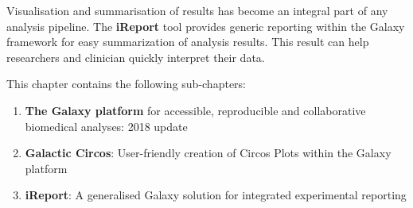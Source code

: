 Visualisation and summarisation of results has become an integral part of any analysis pipeline. The \textbf{iReport} tool provides generic reporting within the Galaxy framework for easy summarization of analysis results. This result can help researchers and clinician quickly interpret their data.


This chapter contains the following sub-chapters:

\begin{enumerate}[label=\ref{chapter:general}.\arabic*]
\itemsep-0.5em
\setcounter{enumi}{-1}
\item \textbf{The Galaxy platform} for accessible, reproducible and collaborative biomedical analyses: 2018 update
\item \textbf{Galactic Circos}: User-friendly creation of Circos Plots within the Galaxy platform
\item \textbf{iReport}: A generalised Galaxy solution for integrated experimental reporting
\end{enumerate}

